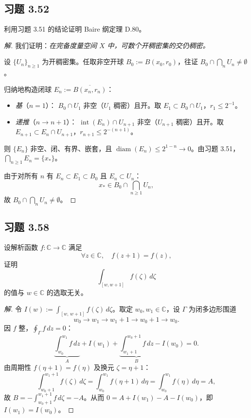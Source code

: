 \documentclass[11pt,a4paper]{article}
\newcommand{\C}{\mathbb{C}}
\theoremstyle{definition}
\newenvironment{solution}{\begin{proof}[解]}{\end{proof}}
\begin{document}
\subsection{习题 3.52}

利用习题 3.51 的结论证明 Baire 纲定理 D.80。

\begin{solution}
	我们证明：\emph{在完备度量空间 $X$ 中，可数个开稠密集的交仍稠密。}

	设 $\{U_n\}_{n\ge1}$ 为开稠密集。任取非空开球 $B_0:=B(x_0,r_0)$，往证 $B_0\cap\bigcap_n U_n\neq\emptyset$。

	归纳地构造闭球 $E_n:=\overline{B(x_n,r_n)}$：
	\begin{itemize}\setlength\itemsep{2pt}
		\item \emph{基}（$n=1$）：\;
		$B_0\cap U_1$ 非空（$U_1$ 稠密）且开。取 $E_1\subset B_0\cap U_1$，$r_1\le2^{-1}$。
		\item \emph{递推}（$n\to n{+}1$）：\;
		$\operatorname{int}(E_n)\cap U_{n+1}$ 非空（$U_{n+1}$ 稠密）且开。取 $E_{n+1}\subset E_n\cap U_{n+1}$，$r_{n+1}\le2^{-(n+1)}$。
	\end{itemize}
	则 $\{E_n\}$ 非空、闭、有界、嵌套，且 $\operatorname{diam}(E_n)\le2^{1-n}\to0$。由习题 3.51，$\bigcap_{n\ge1}E_n=\{x_*\}$。

	由于对所有 $n$ 有 $E_n\subset E_1\subset B_0$ 且 $E_n\subset U_n$：
	\[
		x_*\in B_0\cap\bigcap_{n\ge1}U_n,
	\]
	故 $B_0\cap\bigcap_n U_n\neq\emptyset$。
\end{solution}

\subsection{习题 3.58}

设解析函数 $f : \C \to \C$ 满足
\[
	\forall z\in\C,\quad f(z+1)=f(z),
\]
证明
\[
	\int_{[w,w+1]} f(\zeta)\,d\zeta
\]
的值与 $w\in\C$ 的选取无关。

\begin{solution}
	令 $I(w):=\int_{[w,\,w+1]}f(\zeta)\,d\zeta$。取定 $w_0,w_1\in\C$，设 $\Gamma$ 为闭多边形围道
	\[
		w_0\to w_1\to w_1{+}1\to w_0{+}1\to w_0.
	\]
	因 $f$ 整，$\oint_\Gamma f\,dz=0$：
	\[
		\underbrace{\int_{w_0}^{w_1}f\,dz}_{A}
		+I(w_1)
		+\underbrace{\int_{w_1+1}^{w_0+1}f\,dz}_{B}
		-I(w_0)=0.
	\]
	由周期性 $f(\eta+1)=f(\eta)$ 及换元 $\zeta=\eta+1$：
	\[
		\int_{w_0+1}^{w_1+1}f(\zeta)\,d\zeta
		=\int_{w_0}^{w_1}f(\eta+1)\,d\eta
		=\int_{w_0}^{w_1}f(\eta)\,d\eta=A,
	\]
	故 $B=-\int_{w_0+1}^{w_1+1}f\,d\zeta=-A$。从而 $0=A+I(w_1)-A-I(w_0)$，即 $I(w_1)=I(w_0)$。\qedhere
\end{solution}
\end{document}
